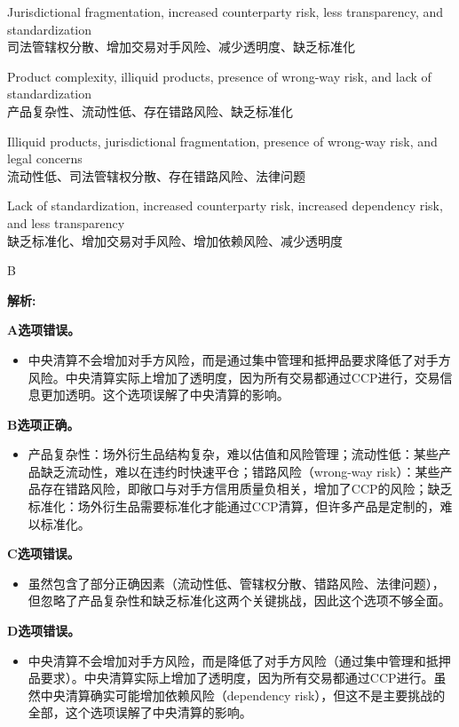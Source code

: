 \documentclass{article}
\newenvironment{explanation}
{\textbf{解析:}\par}
{\par}
\begin{document}
\begin{choices}
    \item Jurisdictional fragmentation, increased counterparty risk, less transparency, and standardization\\
    司法管辖权分散、增加交易对手风险、减少透明度、缺乏标准化
    \item Product complexity, illiquid products, presence of wrong-way risk, and lack of standardization\\
    产品复杂性、流动性低、存在错路风险、缺乏标准化
    \item Illiquid products, jurisdictional fragmentation, presence of wrong-way risk, and legal concerns\\
    流动性低、司法管辖权分散、存在错路风险、法律问题
    \item Lack of standardization, increased counterparty risk, increased dependency risk, and less transparency\\
    缺乏标准化、增加交易对手风险、增加依赖风险、减少透明度
\end{choices}

\begin{correctanswer}
    B
\end{correctanswer}

\begin{explanation}
    \textbf{A选项错误。}
    \begin{itemize}
        \item 中央清算不会增加对手方风险，而是通过集中管理和抵押品要求降低了对手方风险。中央清算实际上增加了透明度，因为所有交易都通过CCP进行，交易信息更加透明。这个选项误解了中央清算的影响。
    \end{itemize}

    \textbf{B选项正确。}
    \begin{itemize}
        \item 产品复杂性：场外衍生品结构复杂，难以估值和风险管理；流动性低：某些产品缺乏流动性，难以在违约时快速平仓；错路风险（wrong-way risk）：某些产品存在错路风险，即敞口与对手方信用质量负相关，增加了CCP的风险；缺乏标准化：场外衍生品需要标准化才能通过CCP清算，但许多产品是定制的，难以标准化。
    \end{itemize}

    \textbf{C选项错误。}
    \begin{itemize}
        \item 虽然包含了部分正确因素（流动性低、管辖权分散、错路风险、法律问题），但忽略了产品复杂性和缺乏标准化这两个关键挑战，因此这个选项不够全面。
    \end{itemize}

    \textbf{D选项错误。}
    \begin{itemize}
        \item 中央清算不会增加对手方风险，而是降低了对手方风险（通过集中管理和抵押品要求）。中央清算实际上增加了透明度，因为所有交易都通过CCP进行。虽然中央清算确实可能增加依赖风险（dependency risk），但这不是主要挑战的全部，这个选项误解了中央清算的影响。
    \end{itemize}

\end{explanation}
\end{document}
